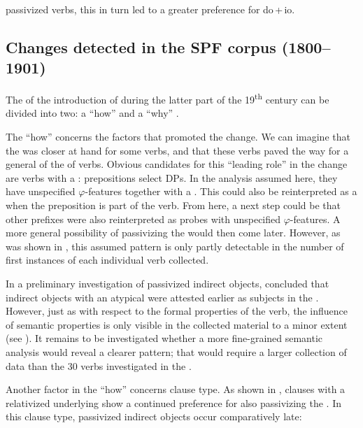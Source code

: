 \documentclass[output=paper]{langscibook}
\begin{document}
passivized  verbs, this in turn led to a greater preference for do\,+\,io.

\subsection{Changes detected in the SPF corpus (1800–1901)}\label{sec:falk:5.2}


The  of the introduction of  during the latter part of the 19\textsuperscript{th} century can be divided into two: a “how”  and a “why” .


The “how”  concerns the factors that promoted the change. We can imagine that the  was closer at hand for some verbs, and that these verbs paved the way for a general  of the  of  verbs. Obvious candidates for this “leading role” in the change are verbs with a : prepositions select DPs. In the analysis assumed here, they have unspecified $\varphi ${}-features together with a . This  could also be reinterpreted as a  when the preposition is part of the verb. From here, a next step could be that other prefixes were also reinterpreted as probes with unspecified $\varphi ${}-features. A more general possibility of passivizing the  would then come later. However, as was shown in , this assumed pattern is only partly detectable in the number of first instances of each individual verb collected.



In a preliminary investigation of passivized indirect objects, \citet{Falk1995,Falk1997} concluded that indirect objects with an atypical  were attested earlier as subjects in the . However, just as with respect to the formal properties of the verb, the influence of semantic properties is only visible in the collected material to a minor extent (see ). It remains to be investigated whether a more fine-grained semantic analysis would reveal a clearer pattern; that would require a larger collection of data than the 30 verbs investigated in the .



Another factor in the “how”  concerns clause type. As shown in , clauses with a relativized underlying  show a continued preference for also passivizing the . In this clause type, passivized indirect objects occur comparatively late:
\end{document}

